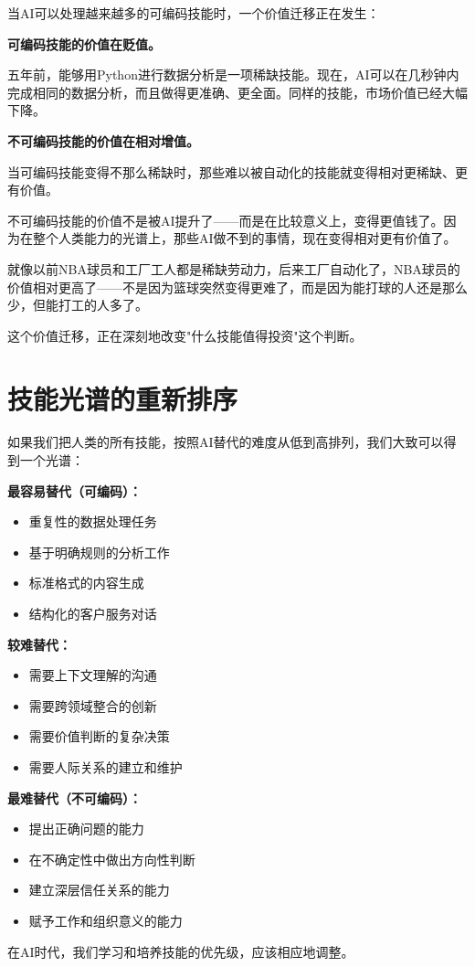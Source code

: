 当AI可以处理越来越多的可编码技能时，一个价值迁移正在发生：

\textbf{可编码技能的价值在贬值。}

五年前，能够用Python进行数据分析是一项稀缺技能。现在，AI可以在几秒钟内完成相同的数据分析，而且做得更准确、更全面。同样的技能，市场价值已经大幅下降。

\textbf{不可编码技能的价值在相对增值。}

当可编码技能变得不那么稀缺时，那些难以被自动化的技能就变得相对更稀缺、更有价值。

不可编码技能的价值不是被AI提升了——而是在比较意义上，变得更值钱了。因为在整个人类能力的光谱上，那些AI做不到的事情，现在变得相对更有价值了。

就像以前NBA球员和工厂工人都是稀缺劳动力，后来工厂自动化了，NBA球员的价值相对更高了——不是因为篮球突然变得更难了，而是因为能打球的人还是那么少，但能打工的人多了。

这个价值迁移，正在深刻地改变"什么技能值得投资"这个判断。

\section{技能光谱的重新排序}


如果我们把人类的所有技能，按照AI替代的难度从低到高排列，我们大致可以得到一个光谱：

\textbf{最容易替代（可编码）：}

\begin{itemize}
\item 重复性的数据处理任务
\item 基于明确规则的分析工作
\item 标准格式的内容生成
\item 结构化的客户服务对话

\end{itemize}
\textbf{较难替代：}

\begin{itemize}
\item 需要上下文理解的沟通
\item 需要跨领域整合的创新
\item 需要价值判断的复杂决策
\item 需要人际关系的建立和维护

\end{itemize}
\textbf{最难替代（不可编码）：}

\begin{itemize}
\item 提出正确问题的能力
\item 在不确定性中做出方向性判断
\item 建立深层信任关系的能力
\item 赋予工作和组织意义的能力

\end{itemize}
在AI时代，我们学习和培养技能的优先级，应该相应地调整。


